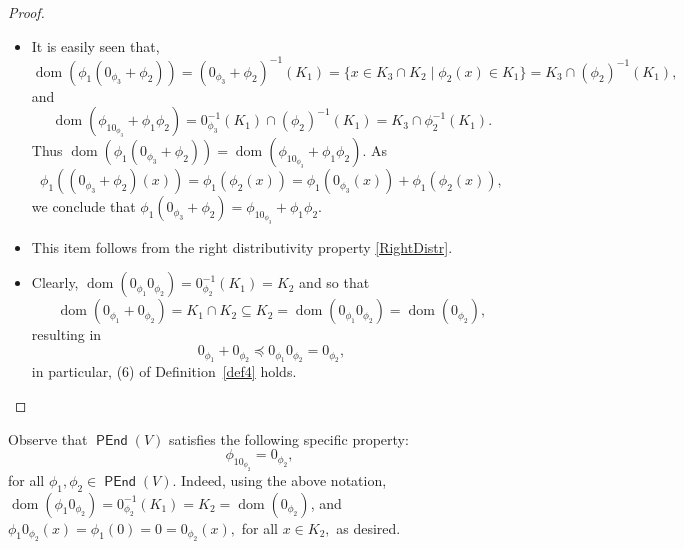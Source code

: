 \documentclass{amsart}
\newcommand{\0}{{\vartheta}}
\theoremstyle{definition}
\theoremstyle{remark}
\numberwithin{equation}{section}
\newtheorem*{Theorem A}{\textbf{Theorem A}}
\newtheorem*{Corollary E}{\textbf{Corollary E}}
\newtheorem*{Corollary F}{\textbf{Corollary F}}
\newtheorem*{Theorem B}{\textbf{Theorem B}}
\newtheorem*{Theorem C}{\textbf{Theorem C}}
\newtheorem*{Theorem D}{\textbf{Theorem B}}
\newtheorem*{p a}{\textbf{Proof of  Theorem A}}
\newtheorem*{p b}{\textbf{Proof of Theorem B}}
\newtheorem*{p c}{\textbf{Proof of  Theorem C}}
\newtheorem*{p d}{\textbf{Proof of  Theorem D}}
\DeclareMathOperator{\dom}{dom}
\DeclareMathOperator{\pen}{\textsf{PEnd}}
\begin{document}
\begin{proof}
\begin{itemize}
\item[$(4)$] %
 It is easily seen that, $$\dom (\phi_1(0_{\phi_3} +\phi_2))=(0_{\phi_3} +\phi_2)^{-1}(K_1)=\{x\in K_3\cap K_2\mid \phi_2(x)\in K_1\}=K_3\cap (\phi_2)^{-1}(K_1),$$
and $$\dom (\phi_10_{\phi_3} +\phi_1\phi_2)= 0_{\phi_3}^{-1}(K_1)\cap(\phi_2)^{-1}(K_1) =K_3\cap \phi_2^{-1}(K_1).$$ 
Thus $\dom (\phi_1(0_{\phi_3} +\phi_2))=\dom (\phi_10_{\phi_3} +\phi_1\phi_2)$. As 
        $$\phi_1 ((0_{\phi_3}+\phi_2)(x))= \phi_1  (\phi_2 (x)) =  \phi_1 (0_{\phi_3} (x))+ \phi_1(\phi_2(x)),$$ we conclude that $\phi_1 (0_{\phi_3}+\phi_2)=\phi_10_{\phi_3} +\phi_1\phi_2.$
        
\item[$(5)$] This item follows from the right distributivity property \eqref{RightDistr}.
\item[$(6)$] Clearly,   $\dom (0_{\phi_1}  0_{\phi _2})=  0_{\phi_2}^{-1}(K_1) = K_2$ and  
so that  $$  \dom (0_{\phi_1} +0_{\phi _2})  = K_1 \cap K_2 \subseteq  K_2= \dom ( 0_{\phi_1}  0_{\phi _2})=  \dom (0_{\phi _2}),$$  resulting in 
$$ 0_{\phi_1} +0_{\phi _2}  \preceq    0_{\phi_1}  0_{\phi _2}=  0_{\phi _2},  $$ 
in particular,  (6) of Definition~\ref{def4} holds.

\end{itemize}  
\end{proof}

 Observe that $\pen(V)$  satisfies the following specific property:
$$\phi_10_{\phi_2}=0_{\phi_2},$$ for all  $ \phi_1, \phi_2 \in \pen(V).$
 Indeed,  using the above notation,  
 $\dom (\phi_1 0_{\phi_2}) =0_{\phi_2}^{-1}(K_1)=K_2=\dom (0_{\phi_2})$, and 
$ \phi_1 0_{\phi_2}(x)= \phi_1 (0)= 0=0_{\phi_2}(x),  $ for all $x\in K_2,$ 
 as desired.
\end{document}
